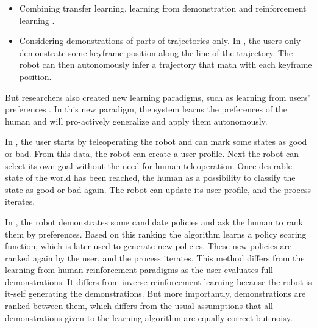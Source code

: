\begin{itemize}
\item Combining transfer learning, learning from demonstration and reinforcement learning \cite{taylor2011integrating}.

\item Considering demonstrations of parts of trajectories only. In \cite{akgun12hri}, the users only demonstrate some keyframe position along the line of the trajectory. The robot can then autonomously infer a trajectory that math with each keyframe position.

\end{itemize}

But researchers also created new learning paradigms, such as learning from users' preferences \cite{Mason2011,akrour2011preference}. In this new paradigm, the system learns the preferences of the human and will pro-actively generalize and apply them autonomously. 

In \cite{Mason2011}, the user starts by teleoperating the robot and can mark some states as good or bad. From this data, the robot can create a user profile. Next the robot can select its own goal without the need for human teleoperation. Once desirable state of the world has been reached, the human as a possibility to classify the state as good or bad again. The robot can update its user profile, and the process iterates.


In \cite{akrour2011preference,akrour2012april,akrour2014programming,wilson2012bayesian}, the robot demonstrates some candidate policies and ask the human to rank them by preferences. Based on this ranking the algorithm learns a policy scoring function, which is later used to generate new policies. These new policies are ranked again by the user, and the process iterates. This method differs from the learning from human reinforcement paradigms as the user evaluates full demonstrations. It differs from inverse reinforcement learning because the robot is it-self generating the demonstrations. But more importantly, demonstrations are ranked between them, which differs from the usual assumptions that all demonstrations given to the learning algorithm are equally correct but noisy.


